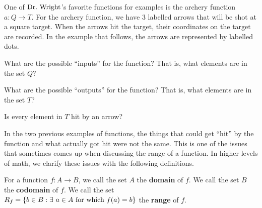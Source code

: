 \begin{question}[resume]
\vspace{1in}

\item One of $\text{Dr.~Wright}$'s favorite functions for examples is the archery function $a: Q \to T$.  For the archery function, we have 3 labelled arrows that will be shot at a square target.  When the arrows hit the target, their coordinates on the target are recorded.  In the example that follows, the arrows are represented by labelled dots.
	\begin{center}
	\end{center}
	\begin{qpart}
	\item What are the possible ``inputs'' for the function?  That is, what elements are in the set $Q$? 
	
	\vspace{1in}
	
	\item What are the possible ``outputs'' for the function?  That is, what elements are in the set $T$?
	
	\vspace{1in}
	
	\item Is every element in $T$ hit by an arrow?
	
	\vspace{1in}
	\end{qpart}
\end{question}
In the two previous examples of functions, the things that could get ``hit'' by the function and what actually got hit were not the same.  This is one of the issues that sometimes comes up when discussing the range of a function.  In higher levels of math, we clarify these issues with the following definitions.  
\begin{definition}  For a function $f: A \to B$, we call the set $A$ the \textbf{domain} of $f$.  We call the set $B$ the \textbf{codomain} of $f$.  We call the set \\
$R_f= \set{b \in B : \exists \ a \in A \ \text{for which} \ f(a)=b}$ the \textbf{range} of $f$.
\end{definition}


